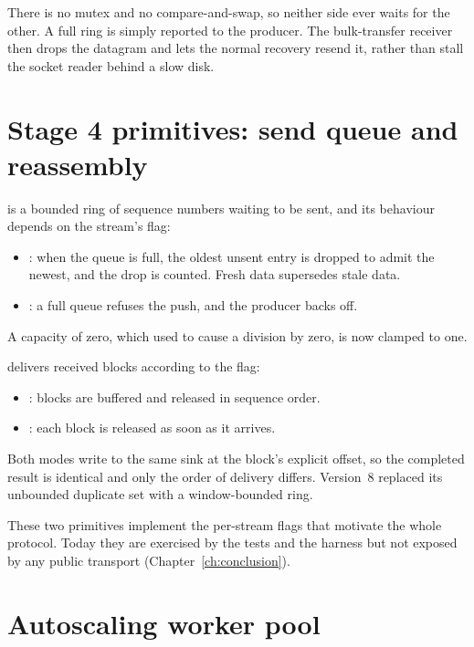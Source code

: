 There is no mutex and no compare-and-swap, so neither side ever waits for the other. A full ring is simply
reported to the producer. The bulk-transfer receiver then drops the datagram and lets the normal recovery
resend it, rather than stall the socket reader behind a slow disk.

\section{Stage 4 primitives: send queue and reassembly}

 is a bounded ring of sequence numbers waiting to be sent, and its behaviour depends on the
stream's  flag:
\begin{itemize}
  \item {}: when the queue is full, the oldest unsent entry is dropped to admit the newest, and
    the drop is counted. Fresh data supersedes stale data.
  \item {}: a full queue refuses the push, and the producer backs off.
\end{itemize}
A capacity of zero, which used to cause a division by zero, is now clamped to one.

 delivers received blocks according to the  flag:
\begin{itemize}
  \item {}: blocks are buffered and released in sequence order.
  \item {}: each block is released as soon as it arrives.
\end{itemize}
Both modes write to the same sink at the block's explicit offset, so the completed result is identical and only
the order of delivery differs. Version~8 replaced its unbounded duplicate set with a window-bounded ring.

These two primitives implement the per-stream flags that motivate the whole protocol. Today they are exercised
by the tests and the  harness but not exposed by any public transport
(Chapter~\ref{ch:conclusion}).

\section{Autoscaling worker pool}\label{sec:orch}

